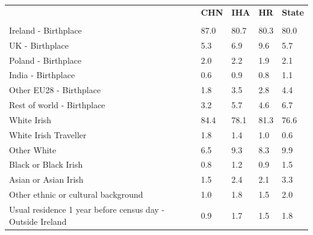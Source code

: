 \documentclass{article}
\begin{document}
\pagebreak
\begin{table}[h]	
\centering
		\begin{tabular}{KTTTT}
  \hline
& \textbf{CHN} & \textbf{IHA} & \textbf{HR}& \textbf{State}\\ 
  \hline
    \\ 
    \hline
Ireland - Birthplace & 87.0& 80.7& 80.3& 80.0\\
UK - Birthplace & 5.3& 6.9& 9.6& 5.7\\
Poland - Birthplace & 2.0& 2.2& 1.9& 2.1\\
India - Birthplace & 0.6& 0.9& 0.8& 1.1\\
Other EU28 - Birthplace & 1.8& 3.5& 2.8& 4.4\\
Rest of world - Birthplace & 3.2& 5.7& 4.6& 6.7\\
    \hline
White Irish & 84.4& 78.1& 81.3& 76.6\\
White Irish Traveller & 1.8& 1.4& 1.0& 0.6\\
Other White & 6.5& 9.3& 8.3& 9.9\\
Black or Black Irish & 0.8& 1.2& 0.9& 1.5\\
Asian or Asian Irish & 1.5& 2.4& 2.1& 3.3\\
Other ethnic or cultural background & 1.0& 1.8& 1.5& 2.0\\
    \hline
Usual residence 1 year before census day - Outside Ireland & 0.9& 1.7& 1.5& 1.8\\


\end{tabular}
\end{table}
\end{document}
